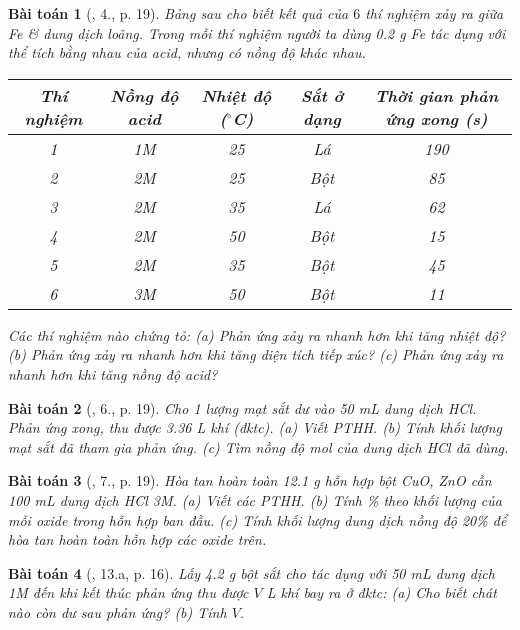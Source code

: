 \documentclass{article}
\newtheorem{baitoan}{Bài toán}
\begin{document}
\begin{baitoan}[\cite{SGK_Hoa_Hoc_9}, 4., p. 19]
	Bảng sau cho biết kết quả của $6$ thí nghiệm xảy ra giữa \emph{Fe} \& dung dịch \emph{} loãng. Trong mỗi thí nghiệm người ta dùng \emph{0.2 g Fe} tác dụng với thể tích bằng nhau của acid, nhưng có nồng độ khác nhau.
	\begin{table}[H]
		\centering
		\begin{tabular}{|c|c|c|c|c|}
			\hline
			Thí nghiệm & Nồng độ acid & Nhiệt độ (${}^\circ$C) & Sắt ở dạng & Thời gian phản ứng xong (s) \\
			\hline
			1 & 1M & 25 & Lá & 190 \\
			\hline
			2 & 2M & 25 & Bột & 85 \\
			\hline
			3 & 2M & 35 & Lá & 62 \\
			\hline
			4 & 2M & 50 & Bột & 15 \\
			\hline
			5 & 2M & 35 & Bột & 45 \\
			\hline
			6 & 3M & 50 & Bột & 11 \\
			\hline
		\end{tabular}
	\end{table}
	\noindent Các thí nghiệm nào chứng tỏ: (a) Phản ứng xảy ra nhanh hơn khi tăng nhiệt độ? (b) Phản ứng xảy ra nhanh hơn khi tăng diện tích tiếp xúc? (c) Phản ứng xảy ra nhanh hơn khi tăng nồng độ acid?
\end{baitoan}

\begin{baitoan}[\cite{SGK_Hoa_Hoc_9}, 6., p. 19]
	Cho 1 lượng mạt sắt dư vào \emph{50 mL} dung dịch \emph{HCl}. Phản ứng xong, thu được \emph{3.36 L} khí (đktc). (a) Viết PTHH. (b) Tính khối lượng mạt sắt đã tham gia phản ứng. (c) Tìm nồng độ mol của dung dịch \emph{HCl} đã dùng.
\end{baitoan}

\begin{baitoan}[\cite{SGK_Hoa_Hoc_9}, 7., p. 19]
	Hòa tan hoàn toàn \emph{12.1 g} hỗn hợp bột \emph{CuO, ZnO} cần \emph{100 mL} dung dịch \emph{HCl 3M}. (a) Viết các PTHH. (b) Tính \% theo khối lượng của mỗi oxide trong hỗn hợp ban đầu. (c) Tính khối lượng dung dịch \emph{} nồng độ \emph{20\%} để hòa tan hoàn toàn hỗn hợp các oxide trên.
\end{baitoan}

\begin{baitoan}[\cite{An_350_BT_Hoa_Hoc_9}, 13.a, p. 16]
	Lấy \emph{4.2 g} bột sắt cho tác dụng với \emph{50 mL} dung dịch \emph{ 1M} đến khi kết thúc phản ứng thu được $V$ \emph{L} khí \emph{} bay ra ở đktc: (a) Cho biết chát nào còn dư sau phản ứng? (b) Tính $V$.
\end{baitoan}
\end{document}
